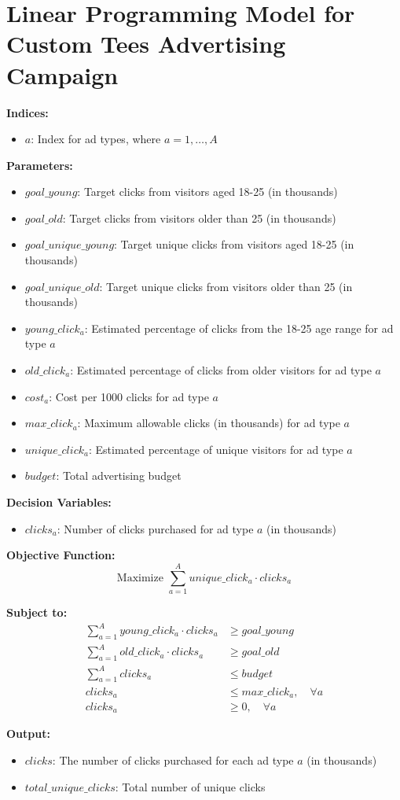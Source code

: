 \documentclass{article}
\begin{document}
\section*{Linear Programming Model for Custom Tees Advertising Campaign}

\textbf{Indices:}
\begin{itemize}
    \item $a$: Index for ad types, where $a = 1, \ldots, A$
\end{itemize}

\textbf{Parameters:}
\begin{itemize}
    \item $goal\_young$: Target clicks from visitors aged 18-25 (in thousands)
    \item $goal\_old$: Target clicks from visitors older than 25 (in thousands)
    \item $goal\_unique\_young$: Target unique clicks from visitors aged 18-25 (in thousands)
    \item $goal\_unique\_old$: Target unique clicks from visitors older than 25 (in thousands)
    \item $young\_click_{a}$: Estimated percentage of clicks from the 18-25 age range for ad type $a$
    \item $old\_click_{a}$: Estimated percentage of clicks from older visitors for ad type $a$
    \item $cost_{a}$: Cost per 1000 clicks for ad type $a$
    \item $max\_click_{a}$: Maximum allowable clicks (in thousands) for ad type $a$
    \item $unique\_click_{a}$: Estimated percentage of unique visitors for ad type $a$
    \item $budget$: Total advertising budget
\end{itemize}

\textbf{Decision Variables:}
\begin{itemize}
    \item $clicks_{a}$: Number of clicks purchased for ad type $a$ (in thousands)
\end{itemize}

\textbf{Objective Function:}
\[
\text{Maximize } \sum_{a=1}^{A} unique\_click_{a} \cdot clicks_{a}
\]

\textbf{Subject to:}
\begin{align*}
\sum_{a=1}^{A} young\_click_{a} \cdot clicks_{a} & \geq goal\_young \\
\sum_{a=1}^{A} old\_click_{a} \cdot clicks_{a} & \geq goal\_old \\
\sum_{a=1}^{A} clicks_{a} & \leq budget \\
clicks_{a} & \leq max\_click_{a}, \quad \forall a \\
clicks_{a} & \geq 0, \quad \forall a
\end{align*}

\textbf{Output:}
\begin{itemize}
    \item $clicks$: The number of clicks purchased for each ad type $a$ (in thousands)
    \item $total\_unique\_clicks$: Total number of unique clicks
\end{itemize}
\end{document}

